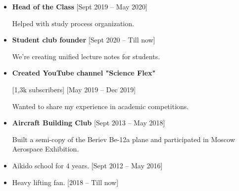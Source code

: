 \begin{itemize}
    \item \textbf{Head of the Class}  \hfill {\small [Sept 2019 -- May 2020]}
    
    Helped with study process organization.
    
    \item \textbf{Student club founder} \hfill
    {\small [Sept 2020 -- Till now]}
    
    We're creating unified lecture notes for students.
    
    \item \textbf{Created YouTube channel "Science Flex"}
    
    [1,3k subscribers] \hfill {\small [May 2019 -- Dec 2019]} 
    
    Wanted to share my experience in academic competitions.
\end{itemize}

\begin{itemize}
    \item \textbf{Aircraft Building Club}
    \hfill
    {\small [Sept 2013 -- May 2018]}
    
    Built a semi-copy of the Beriev Be-12a plane and participated in Moscow Aerospace Exhibition.
    
    \divider
    \item Aikido school for 4 years.
    \hfill
    {\small [Sept 2012 -- May 2016]}
    \item Heavy lifting fan.
    \hfill
    {\small [2018 -- Till now]}
\end{itemize}
    



